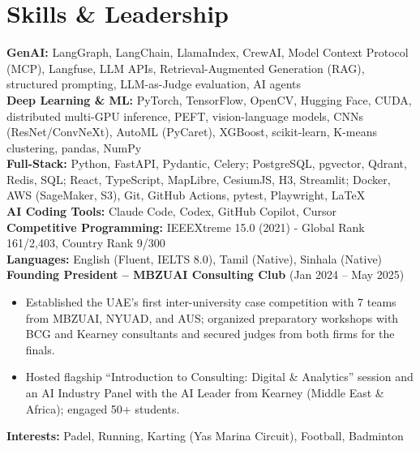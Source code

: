 \documentclass[10pt]{article}
\begin{document}
\section{Skills \& Leadership}
\textbf{GenAI:} LangGraph, LangChain, LlamaIndex, CrewAI, Model Context Protocol (MCP), Langfuse, LLM APIs, Retrieval-Augmented Generation (RAG), structured prompting, LLM-as-Judge evaluation, AI agents \\[2pt]
\textbf{Deep Learning \& ML:} PyTorch, TensorFlow, OpenCV, Hugging Face, CUDA, distributed multi-GPU inference, PEFT, vision-language models, CNNs (ResNet/ConvNeXt), AutoML (PyCaret), XGBoost, scikit-learn, K-means clustering, pandas, NumPy \\[2pt]
\textbf{Full-Stack:} Python, FastAPI, Pydantic, Celery; PostgreSQL, pgvector, Qdrant, Redis, SQL; React, TypeScript, MapLibre, CesiumJS, H3, Streamlit; Docker, AWS (SageMaker, S3), Git, GitHub Actions, pytest, Playwright, \LaTeX \\[2pt]
\textbf{AI Coding Tools:} Claude Code, Codex, GitHub Copilot, Cursor \\[2pt]
\textbf{Competitive Programming:} IEEEXtreme 15.0 (2021) - Global Rank 161/2,403, Country Rank 9/300 \\[2pt]
\textbf{Languages:} English (Fluent, IELTS 8.0), Tamil (Native), Sinhala (Native) \\[2pt]
\vspace{4pt}
\textbf{Founding President -- MBZUAI Consulting Club} (Jan 2024 -- May 2025)
\begin{itemize}
    \item Established the UAE's first inter-university case competition with 7 teams from MBZUAI, NYUAD, and AUS; organized preparatory workshops with BCG and Kearney consultants and secured judges from both firms for the finals.
    \item Hosted flagship ``Introduction to Consulting: Digital \& Analytics'' session and an AI Industry Panel with the AI Leader from Kearney (Middle East \& Africa); engaged 50+ students.
\end{itemize}
\vspace{6pt}
\textbf{Interests:} Padel, Running, Karting (Yas Marina Circuit), Football, Badminton
\end{document}
